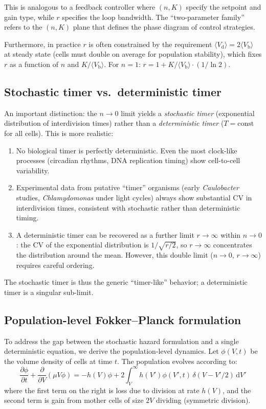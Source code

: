 \documentclass[11pt]{article}
\newcommand{\Vb}{V_{\mathrm{b}}}
\newcommand{\Vd}{V_{\mathrm{d}}}
\newcommand{\dd}{\mathrm{d}}
\begin{document}
This is analogous to a feedback controller where $(n, K)$ specify the setpoint and gain type, while $r$ specifies the loop bandwidth. The ``two-parameter family'' refers to the $(n, K)$ plane that defines the phase diagram of control strategies.

Furthermore, in practice $r$ is often constrained by the requirement $\langle\Vd\rangle = 2\langle\Vb\rangle$ at steady state (cells must double on average for population stability), which fixes $r$ as a function of $n$ and $K/\langle\Vb\rangle$. For $n = 1$: $r = 1 + K/\langle\Vb\rangle \cdot (1/\ln 2)$.

\subsection{Stochastic timer vs.\ deterministic timer}

An important distinction: the $n \to 0$ limit yields a \emph{stochastic timer} (exponential distribution of interdivision times) rather than a \emph{deterministic timer} ($T = \text{const}$ for all cells). This is more realistic:
\begin{enumerate}
  \item No biological timer is perfectly deterministic. Even the most clock-like processes (circadian rhythms, DNA replication timing) show cell-to-cell variability.
  \item Experimental data from putative ``timer'' organisms (early \textit{Caulobacter} studies, \textit{Chlamydomonas} under light cycles) always show substantial CV in interdivision times, consistent with stochastic rather than deterministic timing.
  \item A deterministic timer can be recovered as a further limit $r \to \infty$ within $n \to 0$: the CV of the exponential distribution is $1/\sqrt{r/2}$, so $r \to \infty$ concentrates the distribution around the mean. However, this double limit ($n \to 0$, $r \to \infty$) requires careful ordering.
\end{enumerate}

The stochastic timer is thus the generic ``timer-like'' behavior; a deterministic timer is a singular sub-limit.

\subsection{Population-level Fokker--Planck formulation}

To address the gap between the stochastic hazard formulation and a single deterministic equation, we derive the population-level dynamics. Let $\phi(V, t)$ be the volume density of cells at time $t$. The population evolves according to:
\begin{equation}
  \frac{\partial \phi}{\partial t} + \frac{\partial}{\partial V}(\mu V \phi) = -h(V)\phi + 2\int_V^{\infty} h(V')\phi(V',t)\, \delta(V - V'/2)\, \dd V'
  \label{eq:fokker_planck}
\end{equation}
where the first term on the right is loss due to division at rate $h(V)$, and the second term is gain from mother cells of size $2V$ dividing (symmetric division).
\end{document}
